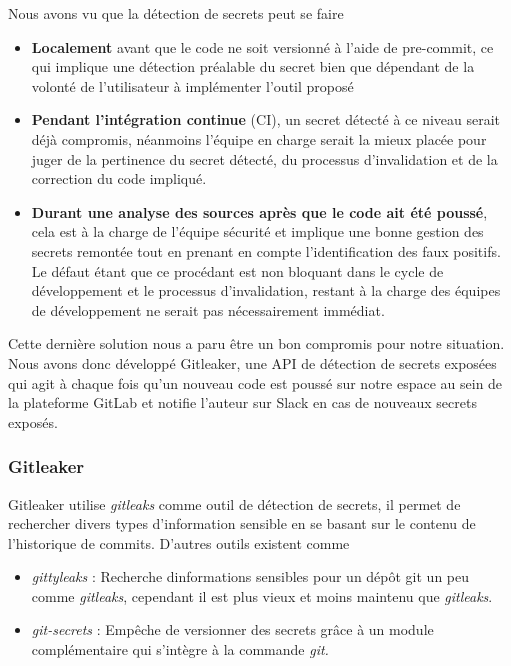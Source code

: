 \documentclass[
  11pt,
  a4paper,
  krantz2,
  11pt,
  oneside]{krantz}
\begin{document}
Nous avons vu que la détection de secrets peut se faire

\begin{itemize}
\item
  \textbf{Localement} avant que le code ne soit versionné à l'aide de pre-commit, ce qui implique une détection préalable du secret bien que dépendant de la volonté de l'utilisateur à implémenter l'outil proposé
\item
  \textbf{Pendant l'intégration continue} (CI), un secret détecté à ce niveau serait déjà compromis, néanmoins l'équipe en charge serait la mieux placée pour juger de la pertinence du secret détecté, du processus d'invalidation et de la correction du code impliqué.
\item
  \textbf{Durant une analyse des sources après que le code ait été poussé}, cela est à la charge de l'équipe sécurité et implique une bonne gestion des secrets remontée tout en prenant en compte l'identification des faux positifs. Le défaut étant que ce procédant est non bloquant dans le cycle de développement et le processus d'invalidation, restant à la charge des équipes de développement ne serait pas nécessairement immédiat.
\end{itemize}

Cette dernière solution nous a paru être un bon compromis pour notre situation. Nous avons donc développé Gitleaker, une API de détection de secrets exposées qui agit à chaque fois qu'un nouveau code est poussé sur notre espace au sein de la plateforme GitLab et notifie l'auteur sur Slack en cas de nouveaux secrets exposés.

\subsubsection{Gitleaker}\label{gitleaker}

Gitleaker utilise \emph{gitleaks} comme outil de détection de secrets, il permet de rechercher divers types d'information sensible en se basant sur le contenu de l'historique de commits. D'autres outils existent comme

\begin{itemize}
\item
  \emph{gittyleaks} : Recherche d\textquotesingle informations sensibles pour un dépôt git un peu comme \emph{gitleaks}, cependant il est plus vieux et moins maintenu que \emph{gitleaks}.
\item
  \emph{git-secrets} : Empêche de versionner des secrets grâce à un module complémentaire qui s'intègre à la commande \emph{git.}
\end{itemize}
\end{document}
